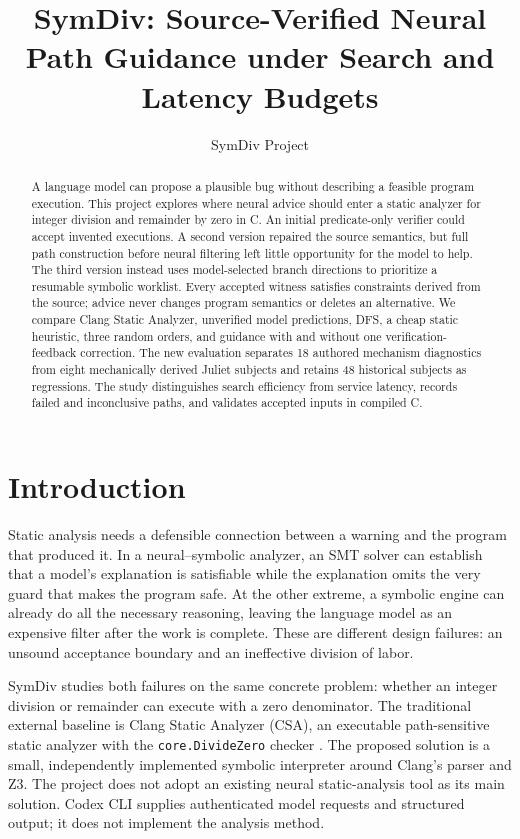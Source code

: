 \documentclass[sigconf]{acmart}
\title[SymDiv: Source-Verified Neural Path Guidance]{SymDiv: Source-Verified Neural Path Guidance under Search and Latency Budgets}
\author{SymDiv Project}
\begin{document}
\begin{abstract}
A language model can propose a plausible bug without describing a feasible
program execution. This project explores where neural advice should enter
a static analyzer for integer division and remainder by zero in C. An initial
predicate-only verifier could accept invented executions. A second version
repaired the source semantics, but full path construction before neural
filtering left little opportunity for the model to help. The third version
instead uses model-selected branch directions to prioritize a resumable
symbolic worklist. Every accepted witness satisfies constraints derived from
the source; advice never changes program semantics or deletes an alternative.
We compare Clang Static Analyzer, unverified model predictions, DFS, a cheap
static heuristic, three random orders, and guidance with and without one
verification-feedback correction. The new evaluation separates 18 authored
mechanism diagnostics from eight mechanically derived Juliet subjects and
retains 48 historical subjects as regressions.
\AbstractResultsVThree{}
The study distinguishes search efficiency from service latency, records
failed and inconclusive paths, and validates accepted inputs in compiled C.
\end{abstract}
\maketitle

\section{Introduction}
Static analysis needs a defensible connection between a warning and the
program that produced it. In a neural--symbolic analyzer, an SMT solver can
establish that a model's explanation is satisfiable while the explanation
omits the very guard that makes the program safe. At the other extreme,
a symbolic engine can already do all the necessary reasoning, leaving the
language model as an expensive filter after the work is complete. These are
different design failures: an unsound acceptance boundary and an ineffective
division of labor.

SymDiv studies both failures on the same concrete problem: whether an integer
division or remainder can execute with a zero denominator. The traditional
external baseline is Clang Static Analyzer (CSA), an executable path-sensitive
static analyzer with the \texttt{core.DivideZero} checker
\cite{clang-checkers,clang-cli}. The proposed solution is a small,
independently implemented symbolic interpreter around Clang's parser and Z3.
The project does not adopt an existing neural static-analysis tool as its
main solution. Codex CLI supplies authenticated model requests and structured
output; it does not implement the analysis method.
\end{document}
